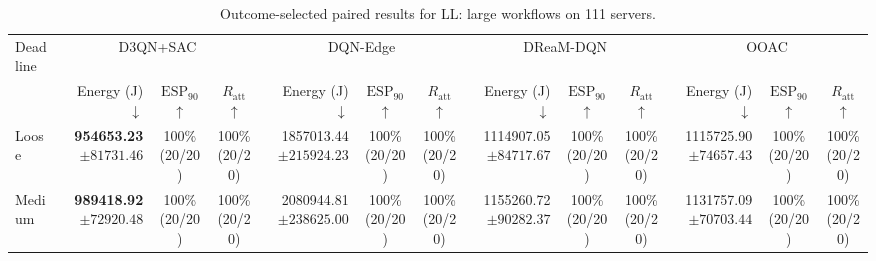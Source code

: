 \begin{table}[!t]
\centering
\caption{Outcome-selected paired results for LL: large workflows on 111 servers.}
\label{tab:conditional_case_ll}
\begingroup
\footnotesize
\setlength{\tabcolsep}{2.2pt}
\renewcommand{\arraystretch}{1.08}
\begin{tabular}{@{}l*{4}{rcc}@{}}
\toprule
Deadline & \multicolumn{3}{c}{D3QN+SAC} & \multicolumn{3}{c}{DQN-Edge} & \multicolumn{3}{c}{DReaM-DQN} & \multicolumn{3}{c}{OOAC} \\
\cmidrule(lr){2-4}\cmidrule(lr){5-7}\cmidrule(lr){8-10}\cmidrule(lr){11-13}
 & Energy (J) $\downarrow$ & $\mathrm{ESP}_{90}$ $\uparrow$ & $R_{\mathrm{att}}$ $\uparrow$ & Energy (J) $\downarrow$ & $\mathrm{ESP}_{90}$ $\uparrow$ & $R_{\mathrm{att}}$ $\uparrow$ & Energy (J) $\downarrow$ & $\mathrm{ESP}_{90}$ $\uparrow$ & $R_{\mathrm{att}}$ $\uparrow$ & Energy (J) $\downarrow$ & $\mathrm{ESP}_{90}$ $\uparrow$ & $R_{\mathrm{att}}$ $\uparrow$ \\
\midrule
Loose & \shortstack[r]{\textbf{954653.23}\\$\pm 81731.46$} & \shortstack[c]{100\%\\(20/20)} & \shortstack[c]{100\%\\(20/20)} & \shortstack[r]{1857013.44\\$\pm 215924.23$} & \shortstack[c]{100\%\\(20/20)} & \shortstack[c]{100\%\\(20/20)} & \shortstack[r]{1114907.05\\$\pm 84717.67$} & \shortstack[c]{100\%\\(20/20)} & \shortstack[c]{100\%\\(20/20)} & \shortstack[r]{1115725.90\\$\pm 74657.43$} & \shortstack[c]{100\%\\(20/20)} & \shortstack[c]{100\%\\(20/20)} \\
Medium & \shortstack[r]{\textbf{989418.92}\\$\pm 72920.48$} & \shortstack[c]{100\%\\(20/20)} & \shortstack[c]{100\%\\(20/20)} & \shortstack[r]{2080944.81\\$\pm 238625.00$} & \shortstack[c]{100\%\\(20/20)} & \shortstack[c]{100\%\\(20/20)} & \shortstack[r]{1155260.72\\$\pm 90282.37$} & \shortstack[c]{100\%\\(20/20)} & \shortstack[c]{100\%\\(20/20)} & \shortstack[r]{1131757.09\\$\pm 70703.44$} & \shortstack[c]{100\%\\(20/20)} & \shortstack[c]{100\%\\(20/20)} \\

\end{tabular}
\end{table}
